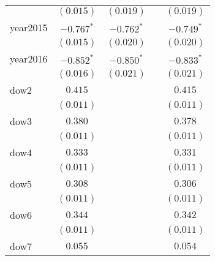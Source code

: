 \begin{center}
\begin{longtable}{l c c c c}
                         & $(0.015)$             & $(0.019)$             &                       & $(0.019)$             \\
year2015                 & $\mathbf{-0.767}^{*}$ & $\mathbf{-0.762}^{*}$ &                       & $\mathbf{-0.749}^{*}$ \\
                         & $(0.015)$             & $(0.020)$             &                       & $(0.020)$             \\
year2016                 & $\mathbf{-0.852}^{*}$ & $\mathbf{-0.850}^{*}$ &                       & $\mathbf{-0.833}^{*}$ \\
                         & $(0.016)$             & $(0.021)$             &                       & $(0.021)$             \\
dow2                     & $0.415$               &                       &                       & $0.415$               \\
                         & $(0.011)$             &                       &                       & $(0.011)$             \\
dow3                     & $0.380$               &                       &                       & $0.378$               \\
                         & $(0.011)$             &                       &                       & $(0.011)$             \\
dow4                     & $0.333$               &                       &                       & $0.331$               \\
                         & $(0.011)$             &                       &                       & $(0.011)$             \\
dow5                     & $0.308$               &                       &                       & $0.306$               \\
                         & $(0.011)$             &                       &                       & $(0.011)$             \\
dow6                     & $0.344$               &                       &                       & $0.342$               \\
                         & $(0.011)$             &                       &                       & $(0.011)$             \\
dow7                     & $0.055$               &                       &                       & $0.054$               \\

\end{longtable}
\end{center}
